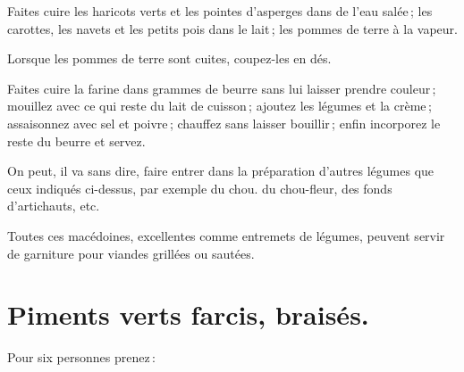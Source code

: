 Faites cuire les haricots verts et les pointes d'asperges dans de l'eau salée ;
les carottes, les navets et les petits pois dans le lait ; les pommes de terre
à la vapeur.

Lorsque les pommes de terre sont cuites, coupez-les en dés.

Faites cuire la farine dans {\mmm} grammes de beurre sans lui laisser
prendre couleur ; mouillez avec ce qui reste du lait de cuisson ; ajoutez les
légumes et la crème ; assaisonnez avec sel et poivre ; chauffez sans laisser
bouillir ; enfin incorporez le reste du beurre et servez.

\sk

On peut, il va sans dire, faire entrer dans la préparation d'autres légumes que
ceux indiqués ci-dessus, par exemple du chou. du chou-fleur, des fonds
d'artichauts, etc.

\medskip

Toutes ces macédoines, excellentes comme entremets de légumes, peuvent servir
de garniture pour viandes grillées ou sautées.

\section*{\centering Piments verts farcis, braisés.}
{}

Pour six personnes prenez :

